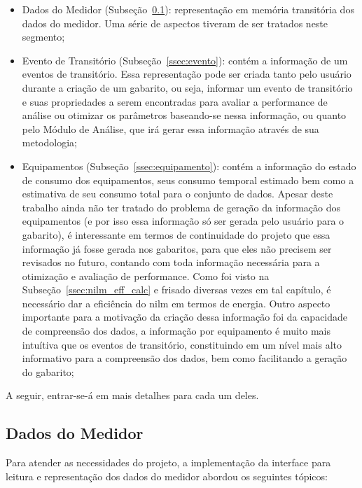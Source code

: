 \begin{itemize}
\item Dados do Medidor (Subseção~\ref{ssec:dados_medidor}):
representação em memória transitória dos dados do medidor. Uma série
de aspectos tiveram de ser tratados neste segmento;
\item Evento de Transitório (Subseção~\ref{ssec:evento}): contém a informação de um
eventos de transitório. Essa representação pode ser criada tanto pelo
usuário durante a criação de um gabarito, ou seja, informar um evento
de transitório e suas propriedades a serem encontradas para avaliar a
performance de análise ou otimizar os parâmetros baseando-se nessa
informação, ou quanto pelo Módulo de Análise, que irá gerar essa
informação através de sua metodologia;
\item Equipamentos (Subseção~\ref{ssec:equipamento}): contém a informação
do estado de consumo dos equipamentos, seus consumo temporal estimado bem
como a estimativa de seu consumo total para o conjunto de dados.
Apesar deste trabalho ainda não ter tratado do problema de geração da
informação dos equipamentos (e por isso essa informação só ser gerada
pelo usuário para o gabarito), é interessante em termos de
continuidade do projeto que essa informação já fosse gerada nos
gabaritos, para que eles não precisem ser revisados no futuro,
contando com toda informação necessária para a otimização e avaliação
de performance. Como foi visto na Subseção~\ref{ssec:nilm_eff_calc} e
frisado diversas vezes em tal capítulo, é necessário dar a eficiência
do \gls{nilm} em termos de energia. Outro aspecto importante para a
motivação da criação dessa informação foi da capacidade de compreensão
dos dados, a informação por equipamento é muito mais intuítiva que os
eventos de transitório, constituindo em um nível mais alto informativo
para a compreensão dos dados, bem como facilitando a geração do
gabarito;
\end{itemize}

A seguir, entrar-se-á em mais detalhes para cada um deles.

\subsection{Dados do Medidor}
\label{ssec:dados_medidor}

Para atender as necessidades do projeto, a implementação da interface
para leitura e representação dos dados do medidor abordou os seguintes
tópicos:

